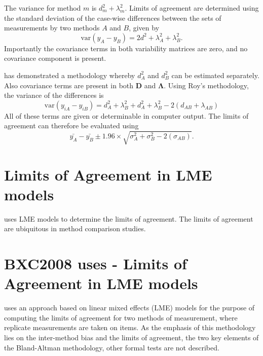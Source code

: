\documentclass[12pt, a4paper]{report}
\theoremstyle{plain}
\theoremstyle{definition}
\theoremstyle{remark}
\begin{document}
The variance for method $m$ is $d^2_{m}+\lambda^2_{m}$. Limits of agreement are determined using the standard deviation of the case-wise differences between the sets of measurements by two methods $A$ and $B$, given by
\begin{equation}
\mbox{var} (y_{A}-y_{B}) = 2d^2 + \lambda^2_{A}+ \lambda^2_{B}.
\end{equation}
Importantly the covariance terms in both variability matrices are zero, and no covariance component is present.


\citet{ARoy2009} has demonstrated a methodology whereby $d^2_{A}$ and $d^2_{B}$ can be estimated separately. Also covariance terms are present in both $\boldsymbol{D}$ and $\boldsymbol{\Lambda}$. Using Roy's methodology, the variance of the differences is
\begin{equation}
\mbox{var} (y_{iA}-y_{iB})= d^2_{A} + \lambda^2_{B} + d^2_{A} + \lambda^2_{B} - 2(d_{AB} + \lambda_{AB})
\end{equation}
All of these terms are given or determinable in computer output.
The limits of agreement can therefore be evaluated using
\begin{equation}
\bar{y_{A}}-\bar{y_{B}} \pm 1.96 \times \sqrt{ \sigma^2_{A} + \sigma^2_{B}  - 2(\sigma_{AB})}.
\end{equation}







\section{Limits of Agreement in LME models}


\citet{BXC2008} uses LME models to determine the limits of agreement. 
The limits of agreement \citep{BA86} are ubiquitous in method comparison studies. 

	\section{BXC2008 uses - Limits of Agreement in LME models}
	
	\citet{BXC2008} uses an approach based on linear mixed effects (LME) models for the purpose of computing the limits of agreement for two methods of measurement, where replicate measurements are taken on items. As the emphasis of this methodology lies on the inter-method bias and the limits of agreement, the two key elements of the Bland-Altman methodology, other formal tests are not described.
	
\end{document}
